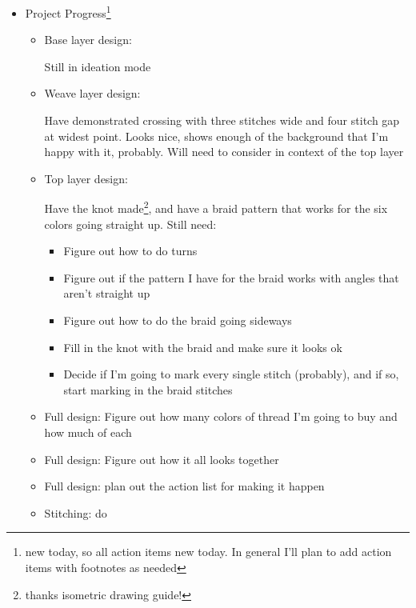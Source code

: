 \documentclass[12pt]{article}
\renewcommand{\,}{\textsuperscript{,}}
\begin{document}
\begin{itemize}
\begin{itemize}
\begin{itemize}
Eh, need to finish the design first anyways.

\item Project Progress\footnote{new today, so all action items new today. In general I'll plan to add action items with footnotes as needed}

\begin{itemize}

\item Base layer design:

Still in ideation mode

\item Weave layer design:

Have demonstrated crossing with three stitches wide and four stitch gap at widest point. Looks nice, shows enough of the background that I'm happy with it, probably.  
Will need to consider in context of the top layer

\item Top layer design:

Have the knot made\footnote{thanks isometric drawing guide!}, and have a braid pattern that works for the six colors going straight up. Still need:

\begin{itemize}

\item Figure out how to do turns  
\item Figure out if the pattern I have for the braid works with angles that aren't straight up  
\item Figure out how to do the braid going sideways  
\item Fill in the knot with the braid and make sure it looks ok  
\item Decide if I'm going to mark every single stitch (probably), and if so, start marking in the braid stitches

\end{itemize}

\item Full design: Figure out how many colors of thread I'm going to buy and how much of each

\item Full design: Figure out how it all looks together

\item Full design: plan out the action list for making it happen

\item Stitching: do

\end{itemize}


\end{itemize}
\end{itemize}
\end{itemize}
\end{document}
